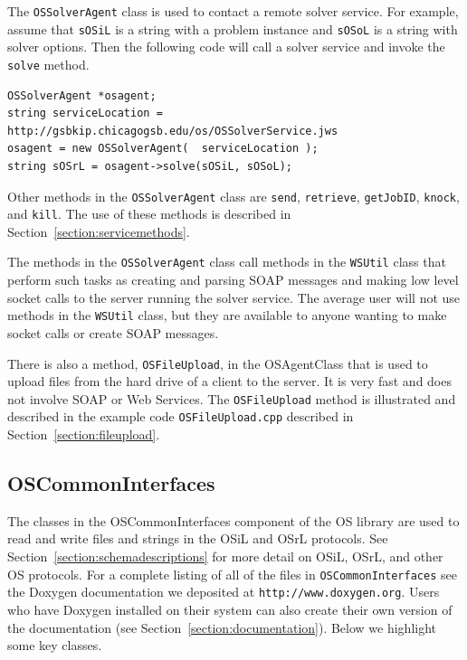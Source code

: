 \documentclass[11pt]{article}
\renewcommand{\_}{{\char"5F}}
\renewcommand{\{}{{\char"7B}}
\renewcommand{\}}{{\char"7D}}
\renewcommand{\^}{{\char"0D}}
\renewcommand{\'}{{\char"0D}}
\newcommand{\UrlDoxygen}{http://www.doxygen.org}
\begin{document}
\begin{enumerate}[Step 1:]
The {\tt OSSolverAgent} class is used to contact a remote solver service.  For example, assume that {\tt sOSiL}
is a string with a problem instance and {\tt sOSoL} is a string with solver options. Then the following code
will call a solver service and invoke the {\tt solve} method.
\begin{verbatim}
OSSolverAgent *osagent;
string serviceLocation = http://gsbkip.chicagogsb.edu/os/OSSolverService.jws
osagent = new OSSolverAgent(  serviceLocation );
string sOSrL = osagent->solve(sOSiL, sOSoL);
\end{verbatim}
Other methods in the {\tt OSSolverAgent} class are {\tt send}, {\tt retrieve}, {\tt getJobID}, {\tt knock}, and {\tt kill}.  The use of these methods is described in Section~\ref{section:servicemethods}.



The methods in the {\tt OSSolverAgent} class call methods in the {\tt WSUtil} class that perform such tasks as creating and parsing SOAP messages and making low level socket calls to the server running the solver service. The average user will not use methods in the {\tt WSUtil} class, but they are available to anyone wanting to make socket calls or create SOAP messages.

There is also a method, {\tt OSFileUpload}, in the OSAgentClass that is used to upload files from the hard drive of a client to the server. It is very fast and does not involve SOAP or Web Services. The {\tt OSFileUpload}  method is illustrated and described in the example code {\tt OSFileUpload.cpp} described in Section~\ref{section:fileupload}.

\subsection{OSCommonInterfaces}

The classes in the OSCommonInterfaces component of the OS library are used to read and write files and strings
in the OSiL and OSrL protocols. See Section~\ref{section:schemadescriptions} for more detail on OSiL, OSrL,
and other OS protocols. For a complete listing of all of the files in {\tt OSCommonInterfaces} see the 
Doxygen documentation we deposited at {\tt\UrlDoxygen}. Users who have Doxygen installed on their system
can also create their own version of the documentation (see Section~\ref{section:documentation}). Below we highlight 
some key classes.






\end{enumerate}
\end{document}
